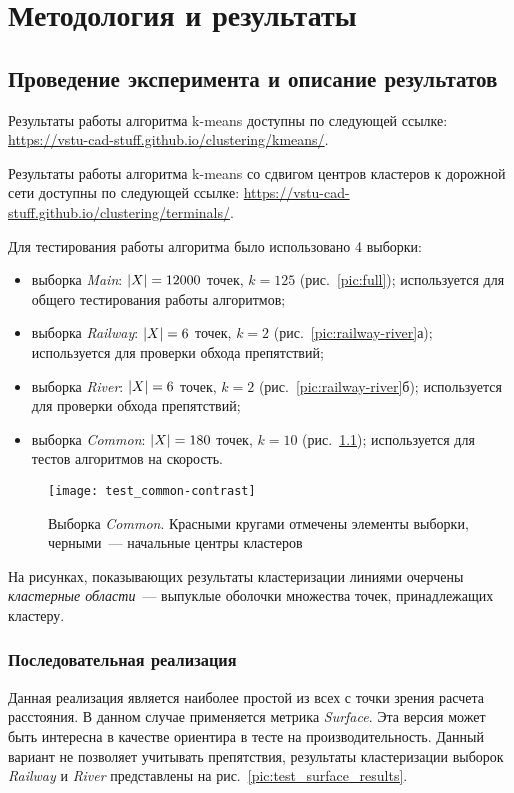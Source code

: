\chapter{Методология и результаты}
\section{Проведение эксперимента и описание результатов}
Результаты работы алгоритма k-means доступны по следующей ссылке:\linebreak
\url{https://vstu-cad-stuff.github.io/clustering/kmeans/}.

Результаты работы алгоритма k-means со сдвигом центров кластеров к дорожной сети доступны по следующей ссылке:\linebreak
\url{https://vstu-cad-stuff.github.io/clustering/terminals/}.

Для тестирования работы алгоритма было использовано 4 выборки:
\begin{itemize}
    \item выборка \emph{Main}: \( \left|X\right| = 12 000 \) точек, \( k = 125 \) (рис.~\ref{pic:full}); используется для общего тестирования работы алгоритмов;
    \item выборка \emph{Railway}: \( \left|X\right| = 6 \) точек, \( k = 2 \) (рис.~\ref{pic:railway-river}а); используется для проверки обхода препятствий;
    \item выборка \emph{River}: \( \left|X\right| = 6 \) точек, \( k = 2 \) (рис.~\ref{pic:railway-river}б); используется для проверки обхода препятствий;
    \item выборка \emph{Common}: \( \left|X\right| = 180 \) точек, \( k = 10 \) (рис.~\ref{pic:common}); используется для тестов алгоритмов на скорость.
\end{itemize}
\begin{figure}[h!]
    \centering
    \texttt{[image: test\_common-contrast]}\\[1ex]
    \parbox{.9\textwidth}{\caption{Выборка \emph{Common}. Красными кругами отмечены элементы выборки, черными~--- начальные центры кластеров}\label{pic:common}}
\end{figure}

На рисунках, показывающих результаты кластеризации линиями очерчены \emph{кластерные области}~--- выпуклые оболочки множества точек, принадлежащих кластеру.

\subsection{Последовательная реализация}
Данная реализация является наиболее простой из всех с точки зрения расчета расстояния. В данном случае применяется метрика \emph{Surface}. Эта версия может быть интересна в качестве ориентира в тесте на производительность. Данный вариант не позволяет учитывать препятствия, результаты кластеризации выборок \emph{Railway} и \emph{River} представлены на рис.~\ref{pic:test_surface_results}.

